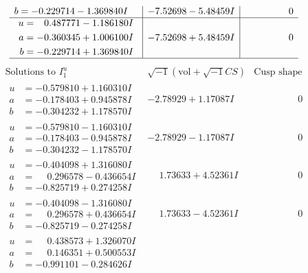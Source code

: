 \documentclass[1p]{elsarticle_modified}
\theoremstyle{definition}
\newcommand{\I}{\sqrt{-1}}
\begin{document}
$$\begin{array}{c|c|c}
\begin{aligned}
b &= -0.229714 - 1.369840 I\end{aligned}
 & -7.52698 - 5.48459 I & \phantom{-0.000000 } 0 \\ \hline\begin{aligned}
u &= \phantom{-}0.487771 - 1.186180 I \\
a &= -0.360345 + 1.006100 I \\
b &= -0.229714 + 1.369840 I\end{aligned}
 & -7.52698 + 5.48459 I & \phantom{-0.000000 } 0\\
 \hline 
 \end{array}$$\newpage$$\begin{array}{c|c|c}  
\text{Solutions to }I^u_{1}& \I (\text{vol} + \sqrt{-1}CS) & \text{Cusp shape}\\
 \hline 
\begin{aligned}
u &= -0.579810 + 1.160310 I \\
a &= -0.178403 + 0.945878 I \\
b &= -0.304232 + 1.178570 I\end{aligned}
 & -2.78929 + 1.17087 I & \phantom{-0.000000 } 0 \\ \hline\begin{aligned}
u &= -0.579810 - 1.160310 I \\
a &= -0.178403 - 0.945878 I \\
b &= -0.304232 - 1.178570 I\end{aligned}
 & -2.78929 - 1.17087 I & \phantom{-0.000000 } 0 \\ \hline\begin{aligned}
u &= -0.404098 + 1.316080 I \\
a &= \phantom{-}0.296578 - 0.436654 I \\
b &= -0.825719 + 0.274258 I\end{aligned}
 & \phantom{-}1.73633 + 4.52361 I & \phantom{-0.000000 } 0 \\ \hline\begin{aligned}
u &= -0.404098 - 1.316080 I \\
a &= \phantom{-}0.296578 + 0.436654 I \\
b &= -0.825719 - 0.274258 I\end{aligned}
 & \phantom{-}1.73633 - 4.52361 I & \phantom{-0.000000 } 0 \\ \hline\begin{aligned}
u &= \phantom{-}0.438573 + 1.326070 I \\
a &= \phantom{-}0.146351 + 0.500553 I \\
b &= -0.991101 - 0.284626 I\end{aligned}

\end{array}$$
\end{document}
